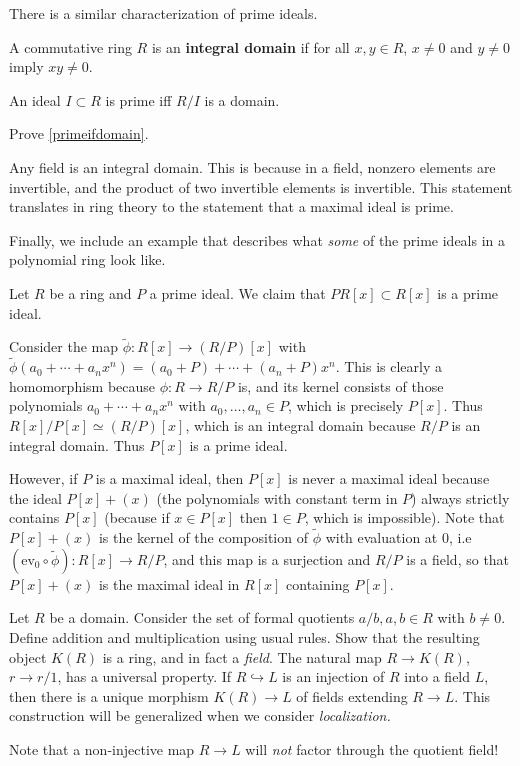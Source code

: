 There is a similar characterization of prime ideals.

\begin{definition} 
A commutative ring $R$ is an \textbf{integral domain} if for all $ x,y \in R$,
$x \neq 0 $ and $y \neq 0$ imply $xy \neq 0$.
\end{definition} 

\begin{proposition} \label{primeifdomain} 
An ideal $I \subset R$ is prime iff $R/I$ is a domain.
\end{proposition} 

\begin{exercise} 
Prove \cref{primeifdomain}.
\end{exercise} 

Any field is an integral domain. This is because in a field, nonzero elements
are invertible, and the product of two invertible elements is invertible. This
statement translates in ring theory to the statement that a maximal ideal is
prime.


Finally, we include an example that describes what \emph{some} of the prime
ideals in a polynomial ring look like.
\begin{example} 
Let $R$ be a ring and $P$ a prime ideal. We claim that $PR[x] \subset R[x]$ is a
prime ideal.

Consider the map $\tilde{\phi}:R[x]\rightarrow(R/P)[x]$ with
$\tilde{\phi}(a_0+\cdots+a_nx^n)=(a_0+P)+\cdots+(a_n+P)x^n$. This is clearly
a homomorphism because $\phi:R\rightarrow R/P$ is, and its kernel consists
of those polynomials $a_0+\cdots+a_nx^n$ with $a_0,\ldots,a_n\in P$, which is
precisely $P[x]$. Thus $R[x]/P[x]\simeq (R/P)[x]$, which is an integral domain
because $R/P$ is an integral domain. Thus $P[x]$ is a prime ideal. 

However, if
$P$ is a maximal ideal, then $P[x]$ is never a maximal ideal because the ideal
$P[x]+(x)$ (the polynomials with constant term in $P$) always strictly contains
$P[x]$ (because if $x\in P[x]$ then $1\in P$, which is impossible). Note
that $P[x]+(x)$ is the kernel of the composition of $\tilde{\phi}$ with
evaluation at 0, i.e $(\text{ev}_0\circ\tilde{\phi}):R[x]\rightarrow R/P$,
and this map is a surjection and $R/P$ is a field, so that $P[x]+(x)$ is
the maximal ideal in $R[x]$ containing $P[x]$.
\end{example} 


\begin{exercise} 
Let $R$ be a domain. Consider the set of formal quotients $a/b, a, b \in R$
with $b \neq 0$. Define addition and multiplication using usual rules. Show
that the resulting object $K(R)$ is a ring, and in fact a \emph{field}. The
natural map $R \to K(R)$, $r \to r/1$, has a universal property. If $R
\hookrightarrow L$ is an injection of $R$ into a field $L$, then there is a
unique morphism $K(R) \to L$ of fields extending $R \to L$. This construction
will be generalized when we consider \emph{localization.}

Note that a non-injective map $R\to L$ will \emph{not} factor through the
quotient field!
\end{exercise} 


